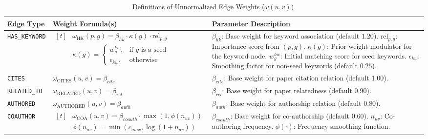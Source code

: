 \begin{table}[!t]
\small
\centering
\caption{Definitions of Unnormalized Edge Weights ($\omega(u,v)$).}
\renewcommand{\arraystretch}{1.}
\begin{tabular}{@{} l| p{6cm} p{7cm} @{}}
\toprule
\textbf{Edge Type} & \textbf{Weight Formula(s)} & \textbf{Parameter Description} \\ 
\midrule
\texttt{HAS\_KEYWORD} & 
$\begin{aligned}[t]
&\omega_{\text{HK}}(p,g) = \beta_{hk} \cdot \kappa(g) \cdot \text{rel}_{p,g} \\
&\kappa(g) = \begin{cases} 
w_g^{kw}, &\text{if } g \text{ is a seed} \\ 
\epsilon_{kw}, &\text{otherwise} 
\end{cases}
\end{aligned}$ & 
$\beta_{hk}$: Base weight for keyword association (default $1.20$). \newline
$\text{rel}_{p,g}$: Importance score from $(p,g)$. \newline
$\kappa(g)$: Prior weight modulator for the keyword node. \newline
$w_g^{kw}$: Initial matching score for seed keywords. \newline
$\epsilon_{kw}$: Smoothing factor for non-seed keywords (default $0.25$). \\
\midrule
\texttt{CITES} & 
$\omega_{\text{CITES}}(u,v) = \beta_{cite}$ & 
$\beta_{cite}$: Base weight for paper citation relation (default $1.00$). \\
\midrule
\texttt{RELATED\_TO} & 
$\omega_{\text{RELATED}}(u,v) = \beta_{rel}$ & 
$\beta_{rel}$: Base weight for paper relatedness (default $0.90$). \\
\midrule
\texttt{AUTHORED} & 
$\omega_{\text{AUTHORED}}(u,v) = \beta_{auth}$ & 
$\beta_{auth}$: Base weight for authorship relation (default $0.80$). \\
\midrule
\texttt{COAUTHOR} & 
$\begin{aligned}[t]
&\omega_{\text{COA}}(u,v) = \beta_{coauth} \cdot \max(1, \phi(n_{uv})) \\
&\phi(n_{uv}) = \min(c_{max}, \log(1+n_{uv}))
\end{aligned}$ & 
$\beta_{coauth}$: Base weight for co-authorship (default $0.60$). \newline
$n_{uv}$: Co-authoring frequency. \newline
$\phi(\cdot)$: Frequency smoothing function. \newline

\end{tabular}
\end{table}
